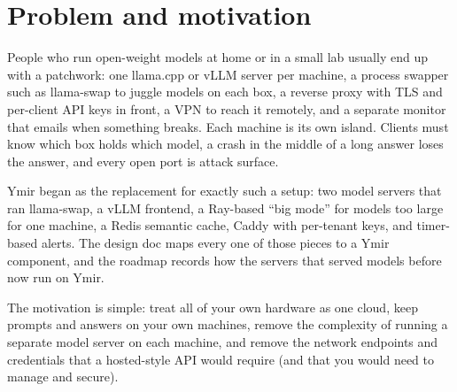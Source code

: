 \section{Problem and motivation}\label{sec:problem}

People who run open-weight models at home or in a small lab usually end up with a patchwork:
one llama.cpp or vLLM server per machine, a process swapper such as llama-swap to juggle models
on each box, a reverse proxy with TLS and per-client API keys in front, a VPN to reach it
remotely, and a separate monitor that emails when something breaks. Each machine is its own
island. Clients must know which box holds which model, a crash in the middle of a long answer
loses the answer, and every open port is attack surface.

Ymir began as the replacement for exactly such a setup: two model servers that ran llama-swap,
a vLLM frontend, a Ray-based ``big mode'' for models too large for one machine, a Redis semantic
cache, Caddy with per-tenant keys, and timer-based alerts. The design doc maps every one of
those pieces to a Ymir component, and the roadmap records how the servers that served models
before now run on Ymir.

The motivation is simple: treat all of your own hardware as one cloud, keep prompts and answers
on your own machines, remove the complexity of running a separate model server on each machine, 
and remove the network endpoints and credentials that a hosted-style API would require
(and that you would need to manage and secure).
